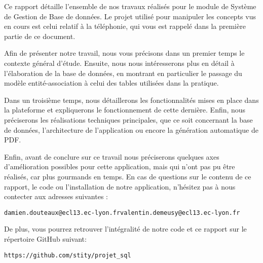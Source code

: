 \label{sec:introduction}
Ce rapport détaille l'ensemble de nos travaux réalisés pour le module de Système de Gestion de Base de données. Le projet utilisé pour manipuler les concepts vus en cours est celui relatif à la téléphonie, qui vous est rappelé dans la première partie de ce document.

Afin de présenter notre travail, nous vous précisons dans un premier temps le contexte général d'étude. Ensuite, nous nous intéresserons plus en détail à l'élaboration de la base de données, en montrant en particulier le passage du modèle entité-association à celui des tables utilisées dans la pratique.

Dans un troisième temps, nous détaillerons les fonctionnalités mises en place dans la plateforme et expliquerons le fonctionnement de cette dernière. Enfin, nous préciserons les réalisations techniques principales, que ce soit concernant la base de données, l'architecture de l'application ou encore la génération automatique de PDF.

Enfin, avant de conclure sur ce travail nous préciserons quelques axes d'amélioration possibles pour cette application, mais qui n'ont pas pu être réalisés, car plus gourmands en temps.
\vspace*{.5cm}
En cas de questions sur le contenu de ce rapport, le code ou l'installation de notre application, n'hésitez pas à nous contecter aux adresses suivantes :
\begin{center}
\texttt{damien.douteaux@ecl13.ec-lyon.fr}\hspace{2cm}\texttt{valentin.demeusy@ecl13.ec-lyon.fr}
\end{center}
De plus, vous pourrez retrouver l'intégralité de notre code et ce rapport sur le répertoire GitHub suivant:
\begin{center}
  \texttt{https://github.com/stity/projet\_sql}
\end{center}

\vspace*{2cm}
\noindent{}
